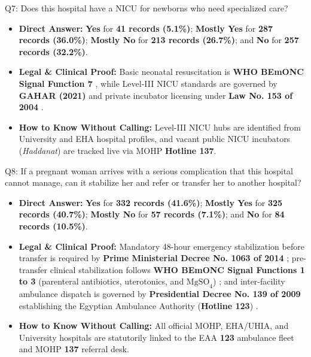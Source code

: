\documentclass[10pt,a4paper]{article}
\begin{document}
\begin{qabox}{Q7: Does this hospital have a NICU for newborns who need specialized care?}
\begin{itemize}
    \item \textbf{Direct Answer:} \textbf{Yes} for \textbf{41 records (5.1\%)}; \textbf{Mostly Yes} for \textbf{287 records (36.0\%)}; \textbf{Mostly No} for \textbf{213 records (26.7\%)}; and \textbf{No} for \textbf{257 records (32.2\%)}.
    \item \textbf{Legal \& Clinical Proof:} Basic neonatal resuscitation is \textbf{WHO BEmONC Signal Function 7} \cite{who2009emonc}, while Level-III NICU standards are governed by \textbf{GAHAR (2021)} \cite{gahar2021hospital} and private incubator licensing under \textbf{Law No. 153 of 2004} \cite{egypt_law_51_1981_153_2004}.
    \item \textbf{How to Know Without Calling:} Level-III NICU hubs are identified from University and EHA hospital profiles, and vacant public NICU incubators (\textit{Haddanat}) are tracked live via MOHP \textbf{Hotline 137}.
\end{itemize}
\end{qabox}

\begin{qabox}{Q8: If a pregnant woman arrives with a serious complication that this hospital cannot manage, can it stabilize her and refer or transfer her to another hospital?}
\begin{itemize}
    \item \textbf{Direct Answer:} \textbf{Yes} for \textbf{332 records (41.6\%)}; \textbf{Mostly Yes} for \textbf{325 records (40.7\%)}; \textbf{Mostly No} for \textbf{57 records (7.1\%)}; and \textbf{No} for \textbf{84 records (10.5\%)}.
    \item \textbf{Legal \& Clinical Proof:} Mandatory 48-hour emergency stabilization before transfer is required by \textbf{Prime Ministerial Decree No. 1063 of 2014} \cite{egypt_pm_decree_1063_2014}; pre-transfer clinical stabilization follows \textbf{WHO BEmONC Signal Functions 1 to 3} (parenteral antibiotics, uterotonics, and $\text{MgSO}_4$) \cite{who2009emonc}; and inter-facility ambulance dispatch is governed by \textbf{Presidential Decree No. 139 of 2009} establishing the Egyptian Ambulance Authority (\textbf{Hotline 123}) \cite{egypt_pres_decree_139_2009_eaa}.
    \item \textbf{How to Know Without Calling:} All official MOHP, EHA/UHIA, and University hospitals are statutorily linked to the EAA \textbf{123} ambulance fleet and MOHP \textbf{137} referral desk.
\end{itemize}
\end{qabox}
\end{document}
